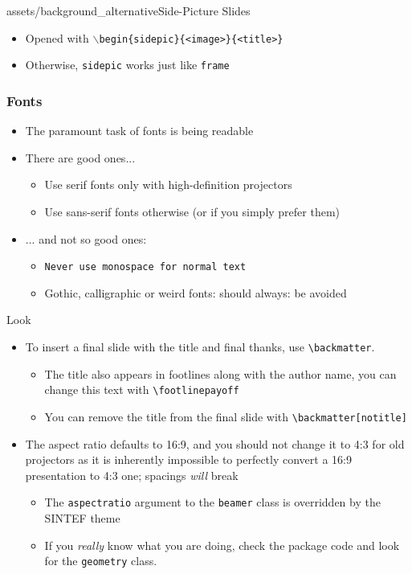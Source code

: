 \documentclass{beamer}
\begin{document}
\begin{sidepic}{assets/background_alternative}{Side-Picture Slides}
\begin{itemize}
\item Opened with \texttt{$\backslash$begin\{sidepic\}\{<image>\}\{<title>\}}
\item Otherwise, \texttt{sidepic} works just like \texttt{frame}
\end{itemize}
\end{sidepic}

\footlinecolor{}
\begin{frame}
\frametitle{Fonts}
\begin{itemize}
\item The paramount task of fonts is being readable
\item There are good ones...
  \begin{itemize}
  \item {\textrm{Use serif fonts only with high-definition projectors}}
  \item {\textsf{Use sans-serif fonts otherwise (or if you simply prefer 
them)}}
  \end{itemize}
\item ... and not so good ones:
  \begin{itemize}
  \item {\texttt{Never use monospace for normal text}}
  \item {\frakfamily Gothic, calligraphic or weird fonts: should always: be
  avoided}
\end{itemize}
\end{itemize}
\end{frame}

\begin{frame}[fragile]{Look}
\begin{itemize}
\item To insert a final slide with the title and final thanks, use \verb|\backmatter|.
      \begin{itemize}
      \item The title also appears in footlines along with the author name, you can change this text with \verb|\footlinepayoff|
      \item You can remove the title from the final slide with \verb|\backmatter[notitle]|
      \end{itemize}
\item The aspect ratio defaults to 16:9, and you should not change it to 4:3
      for old projectors as it is inherently impossible to perfectly convert a 
      16:9 presentation to 4:3 one; spacings \emph{will} break
      \begin{itemize}
      \item The \texttt{aspectratio} argument to the \texttt{beamer} class is
            overridden by the SINTEF theme
      \item If you \emph{really} know what you are doing, check the package
            code and look for the \texttt{geometry} class.
      \end{itemize}
\end{itemize}
\end{frame}
\end{document}
